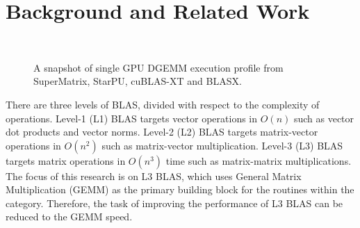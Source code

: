 \documentclass[conference]{IEEEtran}
\begin{document}
\vspace{-0.12in}
\section{Background and Related Work}
\begin{figure}
\vspace{-0.10in}
\centering
\mbox{
}
\hfil
\mbox{
}
\hfil
\mbox{
}
\hfil
\mbox{
}
\caption{A snapshot of single GPU DGEMM execution profile from SuperMatrix, StarPU, cuBLAS-XT and BLASX.}
\label{GPU_profile}
\vspace{-0.25in}
\end{figure}

There are three levels of BLAS, divided with respect to the complexity of operations. 
Level-1 (L1) BLAS targets vector operations in $O(n)$ such as vector dot products and 
vector norms. Level-2 (L2) BLAS targets matrix-vector operations in $O(n^{2})$ such as
matrix-vector multiplication. Level-3 (L3) BLAS \cite{Dongarra} targets matrix operations 
in $O(n^{3})$ time such as matrix-matrix multiplications. The focus of this research is 
on L3 BLAS, which uses General Matrix Multiplication (GEMM) as the primary building 
block for the routines within the category. Therefore, the task of improving the performance 
of L3 BLAS can be reduced to the GEMM speed.
\end{document}
